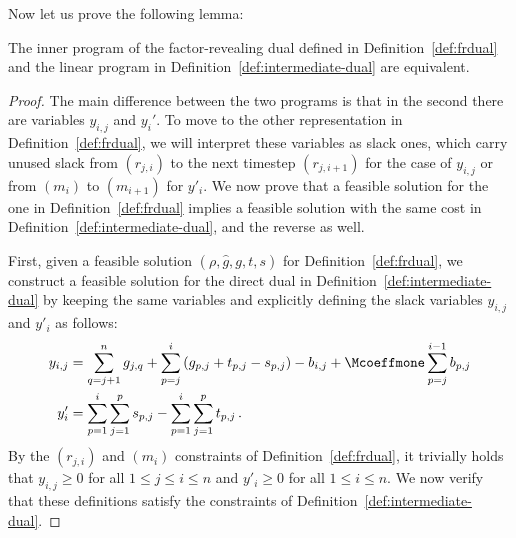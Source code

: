 Now let us prove the following lemma:
\begin{lemma}\label{lem:fr-intermediate-eq-dual}
    The inner program of the factor-revealing dual defined in Definition~\ref{def:frdual} and the linear program in Definition~\ref{def:intermediate-dual} are equivalent.
\end{lemma}
\begin{proof}
    The main difference between the two programs is that in the second there are variables $y_{i,j}$ and $y_i'$. To move to the other representation in Definition~\ref{def:frdual}, we will interpret these variables as slack ones, which carry unused slack from $(r_{j,i})$ to the next timestep $(r_{j,i+1})$ for the case of $y_{i,j}$ or from $(m_i)$ to $(m_{i+1})$ for $y'_i$. We now prove that a feasible solution for the one in Definition~\ref{def:frdual} implies a feasible solution with the same cost in Definition~\ref{def:intermediate-dual}, and the reverse as well.
    
    First, given a feasible solution $(\rho, \hat{g}, g, t, s)$ for Definition~\ref{def:frdual}, we construct a feasible solution for the direct dual in Definition~\ref{def:intermediate-dual} by keeping the same variables and explicitly defining the slack variables $y_{i,j}$ and $y'_i$ as follows:
    \begin{align*}
        y_{i,j} &= \sum_{q=j+1}^n g_{j,q} + \sum_{p=j}^{i} \left(g_{p,j} + t_{p,j} - s_{p,j}\right) - b_{i,j} + \Mcoeffmone \sum_{p=j}^{i-1} b_{p,j} \\
        y'_i &= \sum_{p=1}^i \sum_{j=1}^p s_{p,j} - \sum_{p=1}^i \sum_{j=1}^p t_{p,j}\,.
    \end{align*}
    By the $(r_{j,i})$ and $(m_i)$ constraints of Definition~\ref{def:frdual}, it trivially holds that $y_{i,j} \geq 0$ for all $1 \le j \le i \le n$ and $y'_i \geq 0$ for all $1 \le i \le n$. We now verify that these definitions satisfy the constraints of Definition~\ref{def:intermediate-dual}.
    

\end{proof}
